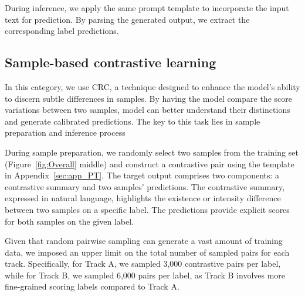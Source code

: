 \documentclass[11pt]{article}
\begin{document}
During inference, we apply the same prompt template to incorporate the input text for prediction. By parsing the generated output, we extract the corresponding label predictions.

\subsection{Sample-based contrastive learning}
\label{sec:CRC}
In this category, we use CRC, a technique designed to enhance the model’s ability to discern subtle differences in samples. 
By having the model compare the score variations between two samples, model can better understand their distinctions and generate calibrated predictions.
The key to this task lies in sample preparation and inference process


During sample preparation, we randomly select two samples from the training set (Figure~\ref{fig:Overall} middle) and construct a contrastive pair using the template in Appendix~\ref{sec:app_PT}. The target output comprises two components: a contrastive summary and two samples' predictions. The contrastive summary, expressed in natural language, highlights the existence or intensity difference between two samples on a specific label. The predictions provide explicit scores for both samples on the given label. 


Given that random pairwise sampling can generate a vast amount of training data, we imposed an upper limit on the total number of sampled pairs for each track. Specifically, for Track A, we sampled 3,000 contrastive pairs per label, while for Track B, we sampled 6,000 pairs per label, as Track B involves more fine-grained scoring labels compared to Track A.
\end{document}
